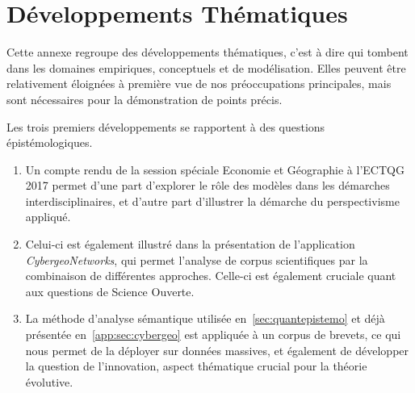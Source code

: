 



\newpage

\chapter{Développements Thématiques}


\label{app:thematic} %



Cette annexe regroupe des développements thématiques, c'est à dire qui tombent dans les domaines empiriques, conceptuels et de modélisation. Elles peuvent être relativement éloignées à première vue de nos préoccupations principales, mais sont nécessaires pour la démonstration de points précis.


Les trois premiers développements se rapportent à des questions épistémologiques.
\begin{enumerate}
	\item Un compte rendu de la session spéciale Economie et Géographie à l'ECTQG 2017 permet d'une part d'explorer le rôle des modèles dans les démarches interdisciplinaires, et d'autre part d'illustrer la démarche du perspectivisme appliqué.
	\item Celui-ci est également illustré dans la présentation de l'application \textit{CybergeoNetworks}, qui permet l'analyse de corpus scientifiques par la combinaison de différentes approches. Celle-ci est également cruciale quant aux questions de Science Ouverte.
	\item La méthode d'analyse sémantique utilisée en~\ref{sec:quantepistemo} et déjà présentée en~\ref{app:sec:cybergeo} est appliquée à un corpus de brevets, ce qui nous permet de la déployer sur données massives, et également de développer la question de l'innovation, aspect thématique crucial pour la théorie évolutive.
\end{enumerate}

